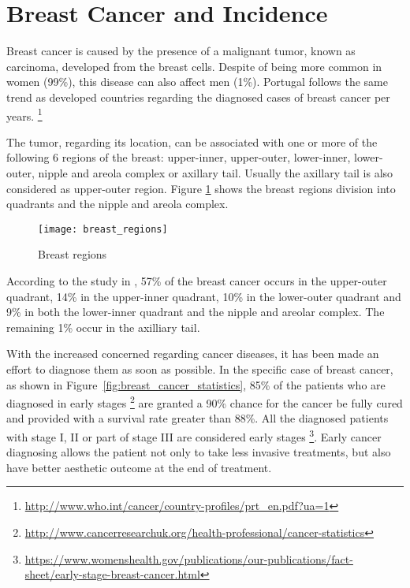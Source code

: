 \section{Breast Cancer and Incidence} \label{sec:incidence}

Breast cancer is caused by the presence of a malignant tumor, known as carcinoma, developed from the breast cells. Despite of being more common in women (99\%), this disease can also affect men (1\%). Portugal follows the same trend as developed countries regarding the diagnosed cases of breast cancer per years. \footnote{\url{http://www.who.int/cancer/country-profiles/prt_en.pdf?ua=1}}

The tumor, regarding its location, can be associated with one or more of the following 6 regions of the breast: upper-inner, upper-outer, lower-inner, lower-outer, nipple and areola complex or axillary tail. Usually the axillary tail is also considered as upper-outer region. Figure \ref{fig:breast regions} shows the breast regions division into quadrants and the nipple and areola complex.

\begin{figure}[H]
\begin{center}
	\leavevmode
    \texttt{[image: breast\_regions]}
    \caption[Breast Regions]{Breast regions \protect\footnotemark}
    \label{fig:breast regions}
\end{center}
\end{figure}

According to the study in \cite{Sohn2008}, 57\% of the breast cancer occurs in the upper-outer quadrant, 14\% in the upper-inner quadrant, 10\% in the lower-outer quadrant and 9\% in both the lower-inner quadrant 
and the nipple and areolar complex. The remaining 1\% occur in the axilliary tail.


With the increased concerned regarding cancer diseases, it has been made an effort to diagnose them as soon as possible. In the specific case of breast cancer, as shown in Figure~\ref{fig:breast_cancer_statistics}, 85\% of the patients who are diagnosed in early stages \footnote{ \url{http://www.cancerresearchuk.org/health-professional/cancer-statistics}} are granted a 90\% chance for the cancer be fully cured and provided with a survival rate greater than 88\%. All the diagnosed patients with stage I, II or part of stage III are considered early stages \footnote{\url{https://www.womenshealth.gov/publications/our-publications/fact-sheet/early-stage-breast-cancer.html}}. Early cancer diagnosing allows the patient not only to take less invasive treatments, but also have better aesthetic outcome at the end of treatment.


